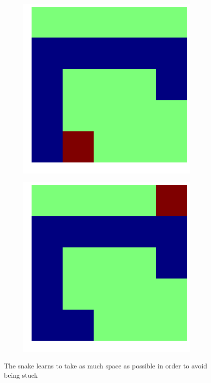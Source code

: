 \documentclass{article}
\begin{document}
\begin{figure}[!htpb]
\begin{subfigure}[b]{.19\linewidth}
  \end{subfigure}
  \begin{subfigure}[b]{.19\linewidth}
    \includegraphics[width=\linewidth]{snake_74.png}
  \end{subfigure}
  \begin{subfigure}[b]{.19\linewidth}
    \includegraphics[width=\linewidth]{snake_75.png}
  \end{subfigure}
  \caption{The snake learns to take as much space as possible in order to avoid being stuck}
  \label{snake_behaviour}
\end{figure}
\end{document}
